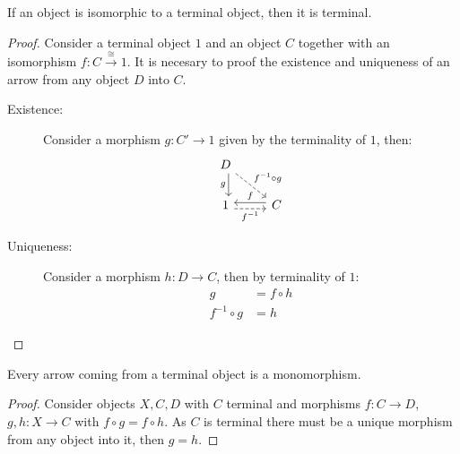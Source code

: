 \begin{theorem}\label{thm:iso_then_terminal}
  If an object is isomorphic to a terminal object, then it is terminal.

  \begin{proof}
    Consider a terminal object $1$ and an object $C$ together with an
    isomorphism $f:C\overset{\cong}{\to} 1$. It is necesary to proof the existence and uniqueness of an arrow from any object $D$ into $C$.

    \begin{description}
      \item[Existence:]
        Consider a morphism $g:C'\to 1$ given by the terminality of $1$, then:
        \[\begin{tikzcd}[ampersand replacement=\&]
          D \\
          1 \& C
          \arrow["f"', shift right=1, from=2-2, to=2-1]
          \arrow["{f^{-1}}"', shift right=1, dashed, from=2-1, to=2-2]
          \arrow["g"', shift left=1, from=1-1, to=2-1]
          \arrow["{f^{-1}\circ g}", dashed, from=1-1, to=2-2]
        \end{tikzcd}\]
      \item[Uniqueness:]
        Consider a morphism $h:D \to C$, then by terminality of $1$:
        \[
          \begin{aligned}
            g &= f \circ h\\
            f^{-1} \circ g &= h
          \end{aligned}
        \]
    \end{description}
  \end{proof}
\end{theorem}

\begin{theorem}\label{thm:terminal_object_mono}
  Every arrow coming from a terminal object is a monomorphism.

  \begin{proof}
    Consider objects $X,C,D$ with $C$ terminal and morphisms $f:C\to D$,
    $g,h:X\to C$ with $f\circ g = f\circ h$. As $C$ is terminal there must be a
    unique morphism from any object into it, then $g=h$.
  \end{proof}
\end{theorem}

